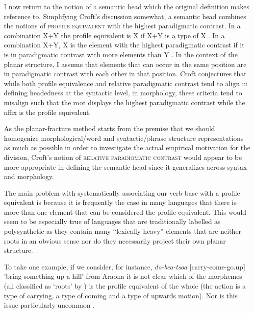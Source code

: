 \documentclass[output=paper,hidelinks]{langscibook}
\begin{document}
I now return to the notion of a semantic head which the original definition makes reference to. Simplifying Croft’s discussion somewhat, a semantic head combines the notions of \textsc{profile equivalent} with the highest paradigmatic contrast. In a combination X+Y the profile equivalent is X if X+Y is a type of X \citep[257]{croft_radical_2001}. In a combination X+Y, X is the element with the highest paradigmatic contrast if it is in paradigmatic contrast with more elements than Y \citep[270]{croft_radical_2001}. In the context of the planar structure, I assume that elements that can occur in the same position are in paradigmatic contrast with each other in that position. Croft conjectures that while both profile equivalence and relative paradigmatic contrast tend to align in defining headedness at the syntactic level, in morphology, these criteria tend to misalign such that the root displays the highest paradigmatic contrast while the affix is the profile equivalent.

As the planar-fracture method starts from the premise that we should homogenize morphological/word and syntactic/phrase structure representations as much as possible in order to investigate the actual empirical motivation for the division, Croft’s notion of \textsc{relative paradigmatic contrast} would appear to be more appropriate in defining the semantic head since it generalizes across syntax and morphology.

The main problem with systematically associating our verb base with
a profile equivalent is because it is frequently the case in many languages that there is more than one element that can be considered the profile equivalent. This would seem to be especially true of languages that are traditionally labelled as polysynthetic as they contain many ``lexically heavy'' elements that are neither roots in an obvious sense nor do they necessarily project their own planar structure.

To take one example, if we consider, for instance, \textit{do-bea-tsoa} $[$carry-come-go.up$]$ ’bring something up a hill’ from Araona it is not clear which of the morphemes (all classified as `roots’ by \cite{pitman:1980:araonasketch}) is the profile equivalent of the whole (the action is a type of carrying, a type of coming and a type of upwards motion). Nor is this issue particularly uncommon .
\end{document}
